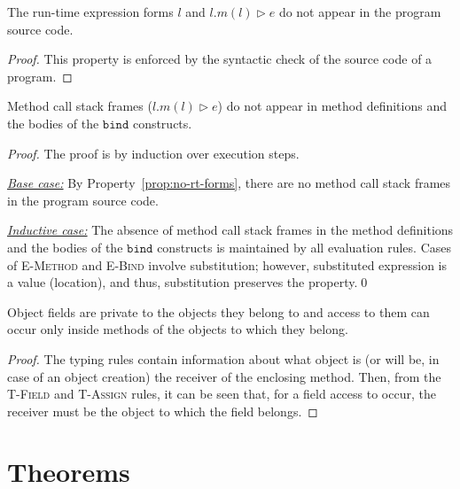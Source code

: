 \documentclass{llncs}
\newcommand{\keywadj}[1]{\mathtt{#1}}
\begin{document}
\begin{property}
\label{prop:no-rt-forms}
The run-time expression forms $l$ and $l.m(l) \rhd e$ do not appear in the program source code.
\end{property}

\begin{proof}
This property is enforced by the syntactic check of the source code of a program.
\end{proof}


\begin{property}
\label{prop:mcsf-def-bind}
Method call stack frames ($l.m(l) \rhd e$) do not appear in method definitions and the bodies of the $\keywadj{bind}$ constructs.
\end{property}

\begin{proof}
The proof is by induction over execution steps.

\noindent\underline{\textit{Base case:}} By Property~\ref{prop:no-rt-forms}, there are no method call stack frames in the program source code.

\noindent\underline{\textit{Inductive case:}} The absence of method call stack frames in the method definitions and the bodies of the $\keywadj{bind}$ constructs is maintained by all evaluation rules. Cases of \textsc{E-Method} and \textsc{E-Bind} involve substitution; however, substituted expression is a value (location), and thus, substitution preserves the property.\qed
\end{proof}


\begin{property}
\label{prop:fields-private}
Object fields are private to the objects they belong to and access to them can occur only inside methods of the objects to which they belong.
\end{property}

\begin{proof}
\noindent The typing rules contain information about what object is (or will be, in case of an object creation) the receiver of the enclosing method. Then, from the \textsc{T-Field} and \textsc{T-Assign} rules, it can be seen that, for a field access to occur, the receiver must be the object to which the field belongs.
\end{proof}


\newpage
\section{Theorems}
\end{document}
